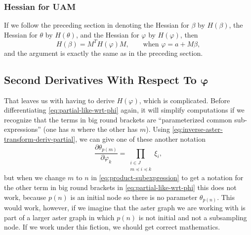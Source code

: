 \subsubsection{Hessian for UAM}
\label{sec:mlogl-hessian-uam}

If we follow the preceding section in denoting the Hessian for $\beta$
by $H(\beta)$, the Hessian for $\theta$ by $H(\theta)$, and the Hessian
for $\varphi$ by $H(\varphi)$, then
\begin{equation} \label{eq:hessian-beta-uam}
   H(\beta) = M^T H(\varphi) M, \qquad \text{when $\varphi = a + M \beta$},
\end{equation}
and the argument is exactly the same as in the preceding section.

\subsection{Second Derivatives With Respect To $\boldsymbol{\varphi}$}
\label{sec:wrt-phi-phi}

That leaves us with having to derive $H(\varphi)$, which is complicated.
Before differentiating \eqref{eq:partial-like-wrt-phi} again, it will
simplify computations if we recognize that the terms in big round brackets
are ``parameterized common sub-expressions'' (one has $n$ where the other
has $m$).  Using \eqref{eq:inverse-aster-transform-deriv-partial}, we can
give one of these another notation
\begin{equation} \label{eq:product-subexpression}
   \frac{\partial \theta_{p(m)}}{\partial \varphi_k}
   =
   \prod_{\substack{i \in J \\ m \preceq i \preceq k}} \xi_i,
\end{equation}
but when we change $m$ to $n$ in \eqref{eq:product-subexpression}
to get a notation for the other
term in big round brackets in \eqref{eq:partial-like-wrt-phi} this
does not work, because $p(n)$ is an initial node so there is no
parameter $\theta_{p(n)}$.
This would work, however, if we imagine that the aster graph we are
working with is part of a larger aster graph in which $p(n)$ is not
initial and not a subsampling node.
If we work under this fiction, we should get correct mathematics.

